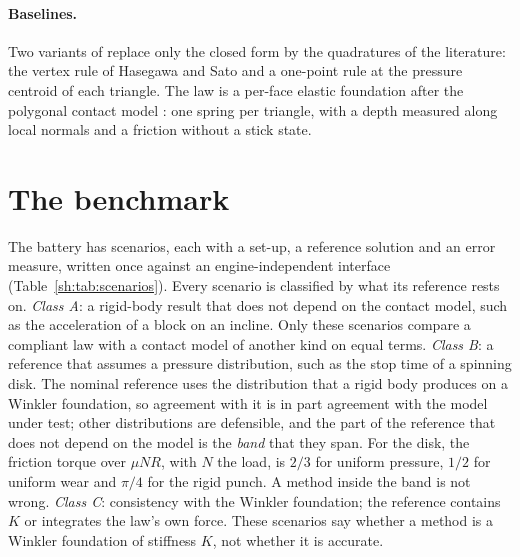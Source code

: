 \paragraph{Baselines.} Two variants of  replace only the closed form by the
quadratures of the literature: the vertex rule of Hasegawa and Sato \cite{Hasegawa2004} and a
one-point rule at the pressure centroid of each triangle. The law  is a per-face
elastic foundation after the polygonal contact model \cite{Hippmann2004}: one spring per
triangle, with a depth measured along local normals and a friction without a stick state.

\section{The benchmark}\label{sh:benchmark}

The battery has  scenarios, each with a set-up, a reference solution
and an error measure, written once against an engine-independent interface
(Table~\ref{sh:tab:scenarios}). Every scenario is classified by what its reference rests on.
\emph{Class A}: a rigid-body result that does not depend on the contact model, such as the
acceleration of a block on an incline. Only these
scenarios compare a compliant law with a contact model of another kind on equal terms.
\emph{Class B}: a reference that assumes a pressure distribution, such as the stop time of a
spinning disk. The nominal reference uses the distribution that a rigid body produces on a
Winkler foundation, so agreement with it is in part agreement with the model under test; other
distributions are defensible, and the part of the reference that does not depend on the model is the \emph{band}
that they span. For the disk, the friction torque over $\mu N R$, with $N$ the load, is $2/3$
for uniform pressure, $1/2$ for uniform wear and $\pi/4$ for the rigid punch. A method inside
the band is not wrong. \emph{Class C}: consistency with the Winkler foundation; the reference
contains $K$ or integrates the law's own force. These scenarios say whether a method is a
Winkler foundation of stiffness $K$, not whether it is accurate.

